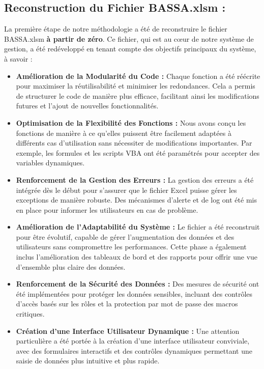 \documentclass[a4paper, oneside, 12pt, final]{extreport}
\begin{document}
\subsection{Reconstruction du Fichier BASSA.xlsm :}
La première étape de notre méthodologie a été de reconstruire le fichier BASSA.xlsm \textbf{à partir de zéro}. Ce fichier, qui est au cœur de notre système de gestion, a été redéveloppé en tenant compte des objectifs principaux du système, à savoir :
\begin{itemize}


\item \textbf{Amélioration de la Modularité du Code :} Chaque fonction a été réécrite pour maximiser la réutilisabilité et minimiser les redondances. Cela a permis de structurer le code de manière plus efficace, facilitant ainsi les modifications futures et l'ajout de nouvelles fonctionnalités.

\item \textbf{Optimisation de la Flexibilité des Fonctions :} Nous avons conçu les fonctions de manière à ce qu'elles puissent être facilement adaptées à différents cas d'utilisation sans nécessiter de modifications importantes. Par exemple, les formules et les scripts VBA ont été paramétrés pour accepter des variables dynamiques.

\item \textbf{Renforcement de la Gestion des Erreurs :} La gestion des erreurs a été intégrée dès le début pour s'assurer que le fichier Excel puisse gérer les exceptions de manière robuste. Des mécanismes d'alerte et de log ont été mis en place pour informer les utilisateurs en cas de problème.

\item \textbf{Amélioration de l'Adaptabilité du Système :} Le fichier a été reconstruit pour être évolutif, capable de gérer l'augmentation des données et des utilisateurs sans compromettre les performances. Cette phase a également inclus l'amélioration des tableaux de bord et des rapports pour offrir une vue d'ensemble plus claire des données.

\item \textbf{Renforcement de la Sécurité des Données :} Des mesures de sécurité ont été implémentées pour protéger les données sensibles, incluant des contrôles d'accès basés sur les rôles et la protection par mot de passe des macros critiques.

\item \textbf{Création d'une Interface Utilisateur Dynamique :} Une attention particulière a été portée à la création d'une interface utilisateur conviviale, avec des formulaires interactifs et des contrôles dynamiques permettant une saisie de données plus intuitive et plus rapide.
\end{itemize}
\end{document}
